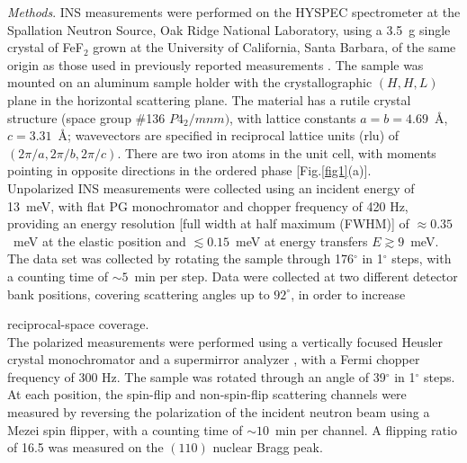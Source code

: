 \documentclass[aps, prl, twocolumn, superscriptaddress, longbibliography]{revtex4-2}
\begin{document}
{\it Methods}.
\gls*{INS} measurements were performed on the HYSPEC spectrometer \cite{Winn_EJC2015,Zaliznyak_JPhys2017} at the Spallation Neutron Source, Oak Ridge National Laboratory, using a 3.5~g single crystal of FeF$_2$ grown at the University of California, Santa Barbara, of the same origin as those used in previously reported measurements \cite{belanger1987_neutronfef2, BELANGER19831095}. The sample was mounted on an aluminum sample holder with the crystallographic $(H,H,L)$ plane in the horizontal scattering plane. The material has a rutile crystal structure (space group \#136 $P4_2/mnm)$, with lattice constants $a=b=4.69$~\AA, $c=3.31$~\AA; wavevectors are specified in reciprocal lattice units (rlu) of $(2\pi/a,2\pi/b,2\pi/c)$. There are two iron atoms in the unit cell, with moments pointing in opposite directions in the ordered phase [Fig.\ref{fig1}(a)].\\

Unpolarized \gls*{INS} measurements were collected using an incident energy of 13~meV, with flat PG monochromator and chopper frequency of 420 Hz, providing an energy resolution [full width at half maximum (FWHM)] of $\approx 0.35$~meV at the elastic position and $\lesssim 0.15$~meV at energy transfers $E \gtrsim 9$~meV. The data set was collected by rotating the sample through 176$^{\circ}$ in 1$^{\circ}$ steps, with a counting time of $\sim 5$~min per step. Data were collected at two different detector bank positions, covering scattering angles up to $92^{\circ}$, in order to increase

reciprocal-space coverage.\\

The polarized measurements were performed using a vertically focused Heusler crystal monochromator and a supermirror analyzer \cite{Zaliznyak_JPhys2017}, with a Fermi chopper frequency of 300 Hz. The sample was rotated through an angle of 39$^{\circ}$ in 1$^{\circ}$ steps. At each position, the spin-flip and non-spin-flip scattering channels were measured by reversing the polarization of the incident neutron beam using a Mezei spin flipper, with a counting time of $\sim 10$~min per channel. A flipping ratio of 16.5 was measured on the $(110)$ nuclear Bragg peak.\\
\end{document}

